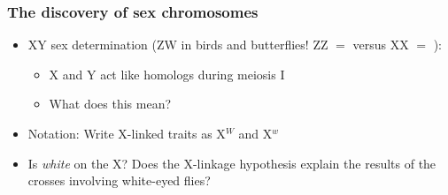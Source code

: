 \begin{frame}
    \frametitle{The discovery of sex chromosomes}
    \begin{itemize}[<+->]
        \item XY sex determination (ZW in birds and butterflies! ZZ $=$ \male
            versus XX $=$ \female):
            \begin{itemize}
                \item X and Y act like homologs during meiosis I
                \item What does this mean? 
            \end{itemize}

        \item Notation: Write X-linked traits as X$^W$ and X$^w$

        \item Is \textit{white} on the X? Does the X-linkage hypothesis explain
            the results of the crosses involving white-eyed flies?
    \end{itemize}
\end{frame}


